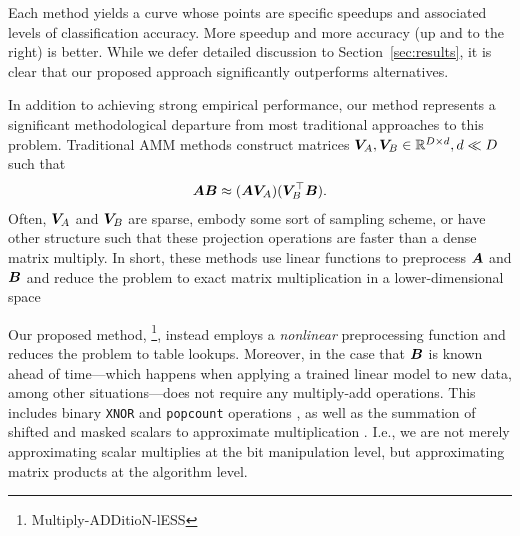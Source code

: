 Each method yields a curve whose points are specific speedups and associated levels of classification accuracy. More speedup and more accuracy (up and to the right) is better. While we defer detailed discussion to Section~\ref{sec:results}, it is clear that our proposed approach significantly outperforms alternatives.


In addition to achieving strong empirical performance, our method represents a significant methodological departure from most traditional approaches to this problem. Traditional AMM methods construct matrices $\bm{V}_A, \bm{V}_B \in \mathbb{R}^{D \times d}, d \ll D$ such that
\begin{align}
    \bm{A} \bm{B} \approx (\bm{A} \bm{V}_A) (\bm{V}_B^\top \bm{B}).
\end{align}
Often, $\bm{V}_A$ and $\bm{V}_B$ are sparse, embody some sort of sampling scheme, or have other structure such that these projection operations are faster than a dense matrix multiply. In short, these methods use linear functions to preprocess $\bm{A}$ and $\bm{B}$ and reduce the problem to exact matrix multiplication in a lower-dimensional space

Our proposed method, \ours\footnote{Multiply-ADDitioN-lESS}, instead employs a \textit{nonlinear} preprocessing function and reduces the problem to table lookups. Moreover, in the case that $\bm{B}$ is known ahead of time---which happens when applying a trained linear model to new data, among other situations---\oursp does not require any multiply-add operations. This includes binary \texttt{XNOR} and \texttt{popcount} operations \cite{xnornet,dorefanet}, as well as the summation of shifted and masked scalars to approximate multiplication \cite{hackyQuasiMultiplies}. I.e., we are not merely approximating scalar multiplies at the bit manipulation level, but approximating matrix products at the algorithm level.






